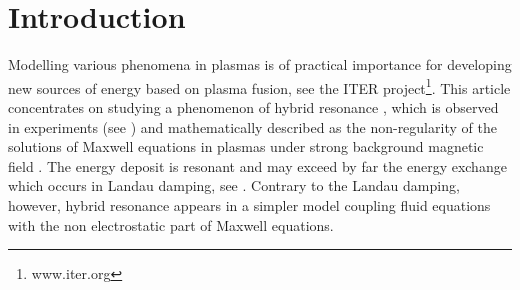 \section{Introduction}
Modelling various phenomena in plasmas is of practical importance for developing new sources of energy 
based on plasma fusion, see the ITER project\footnote{www.iter.org}. 
This article concentrates on studying a phenomenon of hybrid resonance \cite{Stix}, 
which is observed in experiments (see \cite{reflectometers_2006, reflectometers_2010, Dumont_2005}) and 
mathematically described as the non-regularity of
the solutions of Maxwell equations in plasmas under strong background magnetic field \cite{Despres_2014}. 
The energy deposit is resonant and may exceed by far the energy 
exchange which occurs in Landau damping, see \cite{Freidberg_2007,Mouhot_2011}. 
Contrary to the Landau damping, however, 
hybrid resonance appears in a simpler model coupling 
fluid equations with the non electrostatic part of Maxwell equations.


